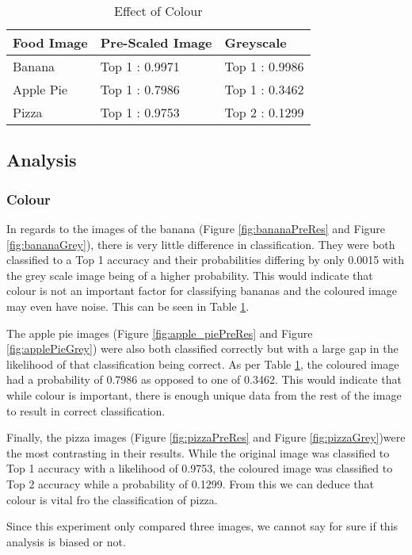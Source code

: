\begin{table}[]
\centering
\caption{Effect of Colour}
\label{colour}
\begin{tabular}{|l|l|l|}
\hline
\textbf{Food Image} & \textbf{Pre-Scaled Image} & \textbf{Greyscale}      \\ \hline
Banana     & Top 1 : 0.9971   & Top 1 : 0.9986 \\ \hline
Apple Pie  & Top 1 : 0.7986   & Top 1 : 0.3462   \\ \hline
Pizza      & Top 1 : 0.9753   & Top 2 : 0.1299 \\ \hline
\end{tabular}
\end{table}

\tocless\subsection{Analysis}
\tocless\subsubsection{Colour}
In regards to the images of the banana (Figure \ref{fig:bananaPreRes} and Figure \ref{fig:bananaGrey}), there is very little difference in classification. They were both classified to a Top 1 accuracy and their probabilities differing by only 0.0015 with the grey scale image being of a higher probability. This would indicate that colour is not an important factor for classifying bananas and the coloured image may even have noise. This can be seen in Table \ref{colour}.

The apple pie images (Figure \ref{fig:apple_piePreRes} and Figure \ref{fig:applePieGrey}) were also both classified correctly but with a large gap in the likelihood of that classification being correct. As per Table \ref{colour}, the coloured image had a probability of 0.7986 as opposed to one of 0.3462. This would indicate that while colour is important, there is enough unique data from the rest of the image to result in correct classification.

Finally, the pizza images (Figure \ref{fig:pizzaPreRes} and Figure \ref{fig:pizzaGrey})were the most contrasting in their results. While the original image was classified to Top 1 accuracy with a likelihood of 0.9753, the coloured image was classified to Top 2 accuracy while a probability of 0.1299. From this we can deduce that colour is vital fro the classification of pizza.

Since this experiment only compared three images, we cannot say for sure if this analysis is biased or not.

